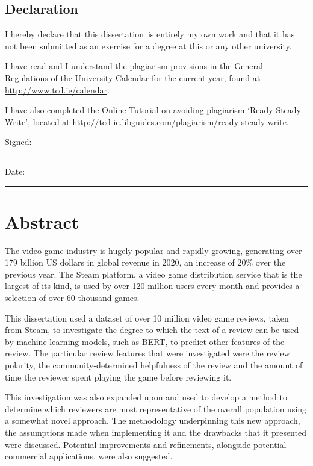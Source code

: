 \documentclass[a4paper,oneside,12pt]{book}
\title{\thesistitle}
\author{\authorname}
\newcommand{\typeofthesis}{dissertation}
\begin{document}

\section*{\Huge{Declaration}}
\vspace{1cm}
I hereby declare that this \typeofthesis\ is entirely my own work and that it has not been submitted as an exercise for a degree at this or any other university.

\vspace{1cm}
I have read and I understand the plagiarism provisions in the General Regulations of the University Calendar for the current year, found at \url{http://www.tcd.ie/calendar}.
\vspace{1cm}

I have also completed the Online Tutorial on avoiding plagiarism `Ready Steady Write', located at \url{http://tcd-ie.libguides.com/plagiarism/ready-steady-write}.
\vspace{3cm}

Signed:~\rule{5cm}{0.3pt}\hfill Date:~\rule{5cm}{0.3pt}

\chapter*{Abstract}

The video game industry is hugely popular and rapidly growing, generating over 179 billion US dollars in global revenue in 2020, an increase of 20\% over the previous year. The Steam platform, a video game distribution service that is the largest of its kind, is used by over 120 million users every month and provides a selection of over 60 thousand games.

This dissertation used a dataset of over 10 million video game reviews, taken from Steam, to investigate the degree to which the text of a review can be used by machine learning models, such as BERT, to predict other features of the review. The particular review features that were investigated were the review polarity, the community-determined helpfulness of the review and the amount of time the reviewer spent playing the game before reviewing it.

This investigation was also expanded upon and used to develop a method to determine which reviewers are most representative of the overall population using a somewhat novel approach. The methodology underpinning this new approach, the assumptions made when implementing it and the drawbacks that it presented were discussed. Potential improvements and refinements, alongside potential commercial applications, were also suggested.
\end{document}
